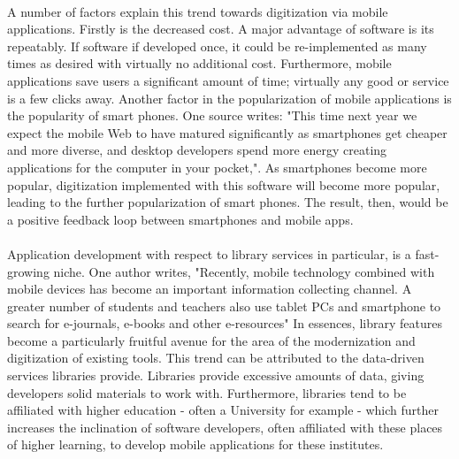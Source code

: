      \paragraph{}
     A number of factors explain this trend towards digitization via mobile applications. Firstly is the decreased cost. A major advantage of software is its repeatably. If software if developed once, it could be re-implemented as many times as desired with virtually no additional cost. Furthermore, mobile applications save users a significant amount of time; virtually any good or service is a few clicks away. Another factor in the popularization of mobile applications is the popularity of smart phones. One source writes: "This time next year we expect the mobile Web to have matured significantly as smartphones get cheaper and more diverse, and desktop developers spend more energy creating applications for the computer in your pocket,"\cite{MobiOne}. As smartphones become more popular, digitization implemented with this software will become more popular, leading to the further popularization of smart phones. The result, then, would be a positive feedback loop between smartphones and mobile apps. 
     
     \paragraph{}
     Application development with respect to library services in particular, is a fast-growing niche. One author writes, "Recently, mobile technology combined with mobile devices has become an important information collecting channel. A greater number of students and teachers also use tablet PCs and smartphone to search for e-journals, e-books and other e-resources"\cite{pu_chiu_chen_huang_2015}
     In essences, library features become a particularly fruitful avenue for the area of the modernization and digitization of existing tools. This trend can be attributed to the data-driven services libraries provide. Libraries provide excessive amounts of data, giving developers solid materials to work with. Furthermore, libraries tend to be affiliated with higher education - often a University for example - which further increases the inclination of software developers, often affiliated with these places of higher learning, to develop mobile applications for these institutes. 
